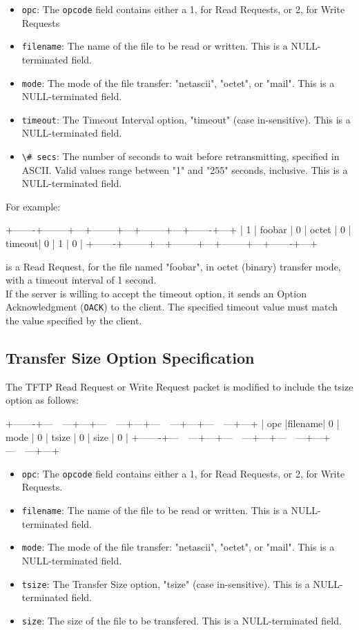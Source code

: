 \documentclass[12pt]{article}
\begin{document}
\begin{itemize}
\item \verb|opc|: The \verb|opcode| field contains either a 1, for Read Requests, or 2, for Write Requests
\item \verb|filename|: The name of the file to be read or written. This is a NULL-terminated field.
\item \verb|mode|: The mode of the file transfer: "netascii", "octet", or "mail". This is a NULL-terminated field.
\item \verb|timeout|: The Timeout Interval option, "timeout" (case in-sensitive). This is a NULL-terminated field.
\item \verb|\# secs|: The number of seconds to wait before retransmitting, specified in ASCII. Valid values range between "1" and "255" seconds, inclusive. This is a NULL-terminated field.
\end{itemize}

For example:

   +-------+--------+---+--------+---+--------+---+-------+---+
   |  1  | foobar | 0 | octet | 0 | timeout| 0 |  1  | 0 |
   +-------+--------+---+--------+---+--------+---+-------+---+

is a Read Request, for the file named "foobar", in octet (binary) transfer mode, with a timeout interval of 1 second.\\

If the server is willing to accept the timeout option, it sends an Option Acknowledgment (\verb|OACK|) to the client. The specified timeout value must match the value specified by the client.

\subsection{Transfer Size Option Specification}
The TFTP Read Request or Write Request packet is modified to include the tsize option as follows:

   +-------+---~~---+---+---~~---+---+---~~---+---+---~~---+---+
   | opc |filename| 0 | mode | 0 | tsize | 0 | size | 0 |
   +-------+---~~---+---+---~~---+---+---~~---+---+---~~---+---+
\begin{itemize}
\item \verb|opc|: The \verb|opcode| field contains either a 1, for Read Requests, or 2, for Write Requests.
\item \verb|filename|: The name of the file to be read or written. This is a NULL-terminated field.
\item \verb|mode|: The mode of the file transfer: "netascii", "octet", or "mail". This is a NULL-terminated field.
\item \verb|tsize|: The Transfer Size option, "tsize" (case in-sensitive). This is a NULL-terminated field.
\item \verb|size|: The size of the file to be transfered. This is a NULL-terminated field.
\end{itemize}
\end{document}
